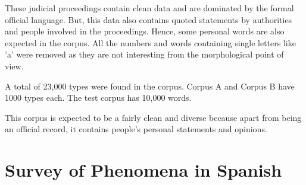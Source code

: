 \documentclass[11pt,letterpaper]{article}
\begin{document}
These judicial proceedings contain clean data and are dominated by the formal official language. But, this data also contains quoted statements by authorities and people involved in the proceedings. Hence, some personal words are also expected in the corpus. All the numbers and words containing single letters like 'a' were removed as they are not interesting from the morphological point of view. 

A total of 23,000 types were found in the corpus. Corpus A and Corpus B have 1000 types each. The test corpus has 10,000 words.

This corpus is expected to be a fairly clean and diverse because apart from being an official record, it contains people's personal statements and opinions.


\section{Survey of Phenomena in Spanish}
\end{document}
